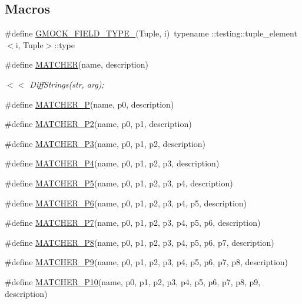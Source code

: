 \subsection*{Macros}
\begin{DoxyCompactItemize}
\item 
\#define \mbox{\hyperlink{gmock-generated-matchers_8h_acf3e27de83a73f0d873da1cd471e505b}{G\+M\+O\+C\+K\+\_\+\+F\+I\+E\+L\+D\+\_\+\+T\+Y\+P\+E\+\_\+}}(Tuple,  i)~typename \+::testing\+::tuple\+\_\+element$<$i, Tuple$>$\+::type
\item 
\#define \mbox{\hyperlink{gmock-generated-matchers_8h_af4fe73ff8e2b0494f4970b575b65ddff}{M\+A\+T\+C\+H\+ER}}(name,  description)
\begin{DoxyCompactList}\small\item\em $<$$<$ Diff\+Strings(str, arg); \end{DoxyCompactList}\item 
\#define \mbox{\hyperlink{gmock-generated-matchers_8h_acb7ae915efa2fd8d3f6ea7313198afb6}{M\+A\+T\+C\+H\+E\+R\+\_\+P}}(name,  p0,  description)
\item 
\#define \mbox{\hyperlink{gmock-generated-matchers_8h_a78efce3ad21c8f68223f5c2d09f2e79d}{M\+A\+T\+C\+H\+E\+R\+\_\+\+P2}}(name,  p0,  p1,  description)
\item 
\#define \mbox{\hyperlink{gmock-generated-matchers_8h_a507103c6251f8bf4393ec119d9e34d34}{M\+A\+T\+C\+H\+E\+R\+\_\+\+P3}}(name,  p0,  p1,  p2,  description)
\item 
\#define \mbox{\hyperlink{gmock-generated-matchers_8h_a6ec420ed6bc3ad073f19a4e32dd1f38f}{M\+A\+T\+C\+H\+E\+R\+\_\+\+P4}}(name,  p0,  p1,  p2,  p3,  description)
\item 
\#define \mbox{\hyperlink{gmock-generated-matchers_8h_a3a9589cd79e2dbdb4e09981510c9c42e}{M\+A\+T\+C\+H\+E\+R\+\_\+\+P5}}(name,  p0,  p1,  p2,  p3,  p4,  description)
\item 
\#define \mbox{\hyperlink{gmock-generated-matchers_8h_aceda758bb064965b2b9a7e0e96085861}{M\+A\+T\+C\+H\+E\+R\+\_\+\+P6}}(name,  p0,  p1,  p2,  p3,  p4,  p5,  description)
\item 
\#define \mbox{\hyperlink{gmock-generated-matchers_8h_a2948ce54387a83c33fa98ba0c73eb11f}{M\+A\+T\+C\+H\+E\+R\+\_\+\+P7}}(name,  p0,  p1,  p2,  p3,  p4,  p5,  p6,  description)
\item 
\#define \mbox{\hyperlink{gmock-generated-matchers_8h_ad86c95b03df37fada38e18d8eb9e53bc}{M\+A\+T\+C\+H\+E\+R\+\_\+\+P8}}(name,  p0,  p1,  p2,  p3,  p4,  p5,  p6,  p7,  description)
\item 
\#define \mbox{\hyperlink{gmock-generated-matchers_8h_a2dc1db146d4112c9fde1c2708807e43e}{M\+A\+T\+C\+H\+E\+R\+\_\+\+P9}}(name,  p0,  p1,  p2,  p3,  p4,  p5,  p6,  p7,  p8,  description)
\item 
\#define \mbox{\hyperlink{gmock-generated-matchers_8h_aa6a3925eeb8bcb4b6b3465cc4ff26650}{M\+A\+T\+C\+H\+E\+R\+\_\+\+P10}}(name,  p0,  p1,  p2,  p3,  p4,  p5,  p6,  p7,  p8,  p9,  description)
\end{DoxyCompactItemize}
